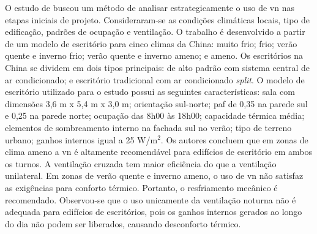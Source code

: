 \documentclass[brazil,hardcopy,openany]{ufscthesis} %
\begin{document}
O estudo de  buscou um método de analisar estrategicamente o uso de \acrshort{vn} nas etapas iniciais de projeto. Consideraram-se as condições climáticas locais, tipo de edificação, padrões de ocupação e ventilação. O trabalho é desenvolvido a partir de um modelo de escritório para cinco climas da China: muito frio; frio; verão quente e inverno frio; verão quente e inverno ameno; e ameno. Os escritórios na China se dividem em dois tipos principais: de alto padrão com sistema central de ar condicionado; e escritório tradicional com ar condicionado \textit{split}. O modelo de escritório utilizado para o estudo possui as seguintes características: sala com dimensões 3,6 m x 5,4 m x 3,0 m; orientação sul-norte; \acrshort{paf} de 0,35 na parede sul e 0,25 na parede norte; ocupação das 8h00 às 18h00; capacidade térmica média; elementos de sombreamento interno na fachada sul no verão; tipo de terreno urbano; ganhos internos igual a 25 W/m$^2$. Os autores concluem que em zonas de clima ameno a \acrshort{vn} é altamente recomendável para edifícios de escritório em ambos os turnos. A ventilação cruzada tem maior eficiência do que a ventilação unilateral.
Em zonas de verão quente e inverno ameno, o uso de \acrshort{vn} não satisfaz as exigências para conforto térmico. Portanto, o resfriamento mecânico é recomendado. Observou-se que o uso unicamente da ventilação noturna não é adequada para edifícios de escritórios, pois os ganhos internos gerados ao longo do dia não podem ser liberados, causando desconforto térmico. 
\end{document}
